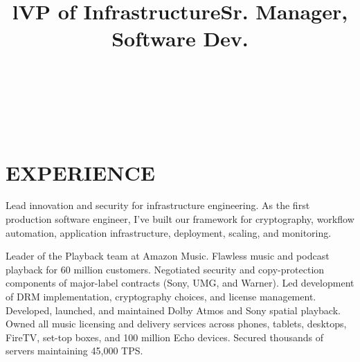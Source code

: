 \documentclass[margin]{res}
\begin{document}
\bigskip

\address{2528 Chilton Way\\ken@hero.net}
\address{Berkeley, CA 94704\\(310) 383-7981}

\begin{resume}

\begin{format}
\title{l}\\
\\
\body\\
\end{format}

\section{EXPERIENCE}

\title{\textbf{VP of Infrastructure}}
\begin{position}
\hspace*{.5cm}Lead innovation and security for infrastructure engineering. As the first production software engineer, I've built our framework for cryptography, workflow automation, application infrastructure, deployment, scaling, and monitoring.
\end{position}
\title{\textbf{Sr. Manager, Software Dev.}}
\begin{position}
\hspace*{.25cm}Leader of the Playback team at Amazon Music. Flawless music and podcast playback for 60 million customers. Negotiated security and copy-protection components of major-label contracts (Sony, UMG, and Warner). Led development of DRM implementation, cryptography choices, and license management. Developed, launched, and maintained Dolby Atmos and Sony spatial playback. Owned all music licensing and delivery services across phones, tablets, desktops, FireTV, set-top boxes, and 100 million Echo devices. Secured thousands of servers maintaining 45,000 TPS.
\end{position}


\end{resume}
\end{document}
